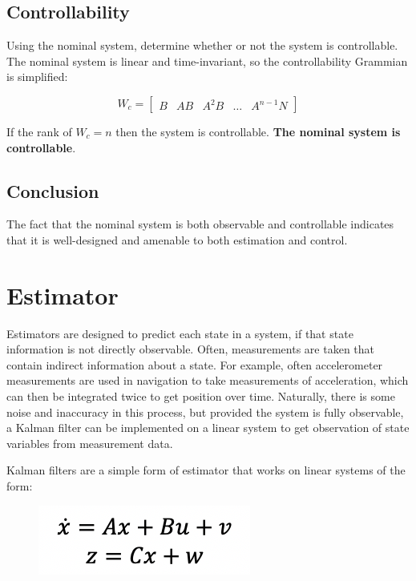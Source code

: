 \documentclass[12pt,onecolumn,reqno]{amsart}
\begin{document}
\subsection{Controllability}
Using the nominal system, determine whether or not the system is controllable. The
nominal system is linear and time-invariant, so the controllability Grammian is
simplified:

\begin{equation}
  W_{c} = 
  \begin{bmatrix}
    B & AB & A^2B & \hdots & A^{n-1}N
  \end{bmatrix}
\end{equation}

If the rank of $W_{c} = n$ then the system is controllable. \textbf{The nominal
system is controllable}.

\subsection{Conclusion}
The fact that the nominal system is both observable and controllable indicates
that it is well-designed and amenable to both estimation and control.


\section{Estimator} \label{sec:kalman_filter}

Estimators are designed to predict each state in a system, if that state information is not directly observable. Often, measurements are taken that contain indirect information about a state. For example, often accelerometer measurements are used in navigation to take measurements of acceleration, which can then be integrated twice to get position over time. Naturally, there is some noise and inaccuracy in this process, but provided the system is fully observable, a Kalman filter can be implemented on a linear system to get observation of state variables from measurement data. 

Kalman filters are a simple form of estimator that works on linear systems of the form:

\begin{figure}[H]
	\includegraphics{system_eqs.png}
	\label{fig:Estimation System Equations}
\end{figure}
\end{document}

